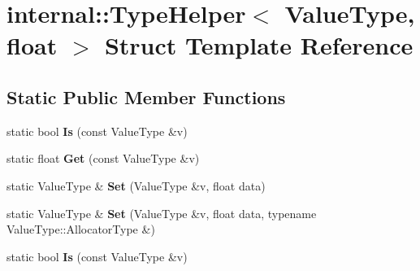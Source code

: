 \hypertarget{structinternal_1_1_type_helper_3_01_value_type_00_01float_01_4}{}\section{internal\+:\+:Type\+Helper$<$ Value\+Type, float $>$ Struct Template Reference}
\label{structinternal_1_1_type_helper_3_01_value_type_00_01float_01_4}
\subsection*{Static Public Member Functions}
\begin{DoxyCompactItemize}
\item 
static bool {\bfseries Is} (const Value\+Type \&v)\hypertarget{structinternal_1_1_type_helper_3_01_value_type_00_01float_01_4_a1108488a02868bb91c3c14f4598bbebc}{}\label{structinternal_1_1_type_helper_3_01_value_type_00_01float_01_4_a1108488a02868bb91c3c14f4598bbebc}

\item 
static float {\bfseries Get} (const Value\+Type \&v)\hypertarget{structinternal_1_1_type_helper_3_01_value_type_00_01float_01_4_aa681e0d25878a7a770b0be82322b435a}{}\label{structinternal_1_1_type_helper_3_01_value_type_00_01float_01_4_aa681e0d25878a7a770b0be82322b435a}

\item 
static Value\+Type \& {\bfseries Set} (Value\+Type \&v, float data)\hypertarget{structinternal_1_1_type_helper_3_01_value_type_00_01float_01_4_a28318c2063421cf18dfa23d16352a3b8}{}\label{structinternal_1_1_type_helper_3_01_value_type_00_01float_01_4_a28318c2063421cf18dfa23d16352a3b8}

\item 
static Value\+Type \& {\bfseries Set} (Value\+Type \&v, float data, typename Value\+Type\+::\+Allocator\+Type \&)\hypertarget{structinternal_1_1_type_helper_3_01_value_type_00_01float_01_4_a3a0d8783f6228504058c427a16687bdf}{}\label{structinternal_1_1_type_helper_3_01_value_type_00_01float_01_4_a3a0d8783f6228504058c427a16687bdf}

\item 
static bool {\bfseries Is} (const Value\+Type \&v)\hypertarget{structinternal_1_1_type_helper_3_01_value_type_00_01float_01_4_a1108488a02868bb91c3c14f4598bbebc}{}\label{structinternal_1_1_type_helper_3_01_value_type_00_01float_01_4_a1108488a02868bb91c3c14f4598bbebc}


\end{DoxyCompactItemize}
